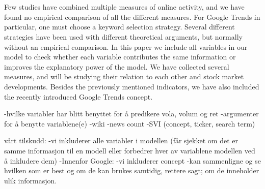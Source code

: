 \\\\
Few studies have combined multiple measures of online activity, and we have found no empirical comparison of all the different measures. For Google Trends in particular, one must choose a keyword selection strategy. Several different strategies have been used with different theoretical arguments, but normally without an empirical comparison. In this paper we include all variables in our model to check whether each variable contributes the same information or improves the explanatory power of the model. We have collected several measures, and will be studying their relation to each other and stock market developments. Besides the previously mentioned indicators, we have also included the recently introduced Google Trends concept. 
\cleardoublepage

-hvilke variabler har blitt benyttet for å predikere vola, volum og ret
-argumenter for å benytte variablene(e)
	-wiki
    -news count
	-SVI (concept, ticker, search term)

vårt tilskudd:
-vi inkluderer alle variabler i modellen (får sjekket om det er samme informasjon til en modell eller forbedrer hver av variablene modellen ved å inkludere dem)
-Innenfor Google: 
	-vi inkluderer concept
	-kan sammenligne og se hvilken som er best og om de kan brukes
    samtidig, rettere sagt; om de inneholder ulik informasjon. 

 
